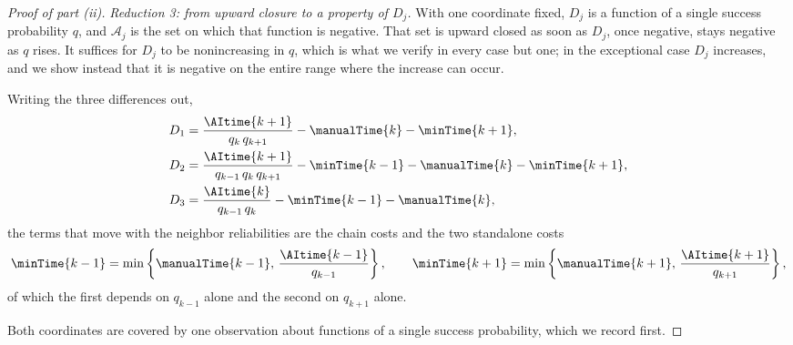 \begin{proof}[Proof of part (ii)]
\emph{Reduction 3: from upward closure to a property of $D_j$.}
With one coordinate fixed, $D_j$ is a function of a single success probability $q$, and $\mathcal{A}_j$ is the set on which that function is negative.
That set is upward closed as soon as $D_j$, once negative, stays negative as $q$ rises.
It suffices for $D_j$ to be nonincreasing in $q$, which is what we verify in every case but one; in the exceptional case $D_j$ increases, and we show instead that it is negative on the entire range where the increase can occur.

Writing the three differences out,
\begin{align*}
D_1 &= \frac{\AItime{k+1}}{q_k\, q_{k+1}} - \manualTime{k} - \minTime{k+1}, \\
D_2 &= \frac{\AItime{k+1}}{q_{k-1}\, q_k\, q_{k+1}} - \minTime{k-1} - \manualTime{k} - \minTime{k+1}, \\
D_3 &= \frac{\AItime{k}}{q_{k-1}\, q_k} - \minTime{k-1} - \manualTime{k},
\end{align*}
the terms that move with the neighbor reliabilities are the chain costs and the two standalone costs
\[ \minTime{k-1} = \min\left\{ \manualTime{k-1},\, \frac{\AItime{k-1}}{q_{k-1}} \right\}, \qquad \minTime{k+1} = \min\left\{ \manualTime{k+1},\, \frac{\AItime{k+1}}{q_{k+1}} \right\}, \]
of which the first depends on $q_{k-1}$ alone and the second on $q_{k+1}$ alone.

Both coordinates are covered by one observation about functions of a single success probability, which we record first.


\end{proof}
